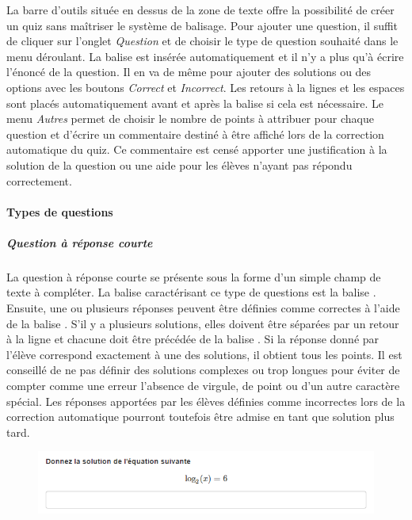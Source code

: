 \documentclass[a4,10pt,french]{sphinxmanual}
\begin{document}
La barre d'outils située en dessus de la zone de texte offre la possibilité de créer un quiz sans maîtriser le système de balisage. Pour ajouter une question, il suffit de cliquer sur l'onglet \emph{Question} et de choisir le type de question souhaité dans le menu déroulant. La balise est insérée automatiquement et il n'y a plus qu'à écrire l'énoncé de la question. Il en va de même pour ajouter des solutions ou des options avec les boutons \emph{Correct} et \emph{Incorrect}. Les retours à la lignes et les espaces sont placés automatiquement avant et après la balise si cela est nécessaire. Le menu \emph{Autres} permet de choisir le nombre de points à attribuer pour chaque question et d'écrire un commentaire destiné à être affiché lors de la correction automatique du quiz. Ce commentaire est censé apporter une justification à la solution de la question ou une aide pour les élèves n'ayant pas répondu correctement.


\paragraph{Types de questions}
\label{doc-user:types-de-questions}

\subparagraph{Question à réponse courte}
\label{doc-user:question-a-reponse-courte}
La question à réponse courte se présente sous la forme d'un simple champ de texte à compléter. La balise caractérisant ce type de questions est la balise . Ensuite, une ou plusieurs réponses peuvent être définies comme correctes à l'aide de la balise \code{=}. S'il y a plusieurs solutions, elles doivent être séparées par un retour à la ligne et chacune doit être précédée de la balise \code{=}. Si la réponse donné par l'élève correspond exactement à une des solutions, il obtient tous les points. Il est conseillé de ne pas définir des solutions complexes ou trop longues pour éviter de compter comme une erreur l'absence de virgule, de point ou d'un autre caractère spécial. Les réponses apportées par les élèves définies comme incorrectes lors de la correction automatique pourront toutefois être admise en tant que solution plus tard.
\begin{figure}[htbp]
\centering

\includegraphics{short.png}
\end{figure}
\end{document}
